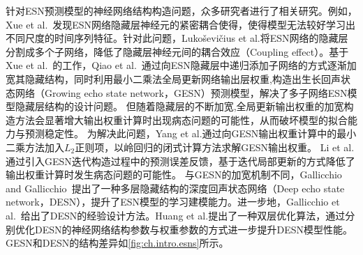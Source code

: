 针对ESN预测模型的神经网络结构构造问题，众多研究者进行了相关研究。例如，Xue et al.~\cite{xueDecoupled2007}发现ESN网络隐藏层神经元的紧密耦合使得，使得模型无法较好学习出不同尺度的时间序列特征。针对此问题，Luko{\v s}evi{\v c}ius et al.\cite{lukovsevivcius2009reservoir}将ESN网络的隐藏层分割成多个子网络，降低了隐藏层神经元间的耦合效应（Coupling effect）。基于Xue et al.~\cite{xueDecoupled2007}的工作，Qiao et al.~\cite{qiaoGrowing2017}通过向ESN隐藏层中递归添加子网络的方式逐渐加宽其隐藏结构，同时利用最小二乘法全局更新网络输出层权重,构造出生长回声状态网络（Growing echo state network，GESN）预测模型，解决了多子网络ESN模型隐藏层结构的设计问题。
但随着隐藏层的不断加宽,全局更新输出权重的加宽构造方法会显著增大输出权重计算时出现病态问题的可能性，从而破坏模型的拟合能力与预测稳定性\cite{yangDynamical2019}。
为解决此问题，Yang et al.\cite{yangDynamical2019}通过向GESN输出权重计算中的最小二乘方法加入$L_2$正则项，以岭回归的闭式计算方法求解GESN输出权重。
Li et al.\cite{liPSObased2019} 通过引入GESN迭代构造过程中的预测误差反馈，基于迭代局部更新的方式降低了输出权重计算时发生病态问题的可能性。
与GESN的加宽机制不同，Gallicchio and Gallicchio~\cite{gallicchioDeep2017}提出了一种多层隐藏结构的深度回声状态网络（Deep echo state network，DESN），提升了ESN模型的学习建模能力。进一步地，Gallicchio et al.~\cite{gallicchioDesign2018}给出了DESN的经验设计方法。Huang et al.\cite{huangFunctional2021}提出了一种双层优化算法，通过分别优化DESN的神经网络结构参数与权重参数的方式进一步提升DESN模型性能。
GESN和DESN的结构差异如\autoref{fig:ch.intro.esns}所示。

